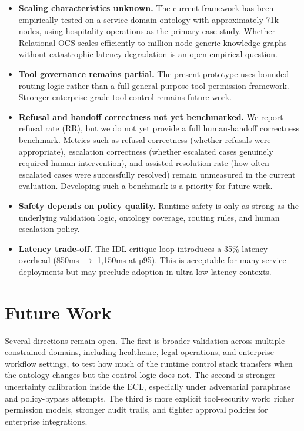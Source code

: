 \documentclass[11pt,a4paper]{article}
\begin{document}
\begin{itemize}
    \item \textbf{Scaling characteristics unknown.} The current framework has been empirically tested on a service-domain ontology with approximately 71k nodes, using hospitality operations as the primary case study. Whether Relational OCS scales efficiently to million-node generic knowledge graphs without catastrophic latency degradation is an open empirical question.
    \item \textbf{Tool governance remains partial.} The present prototype uses bounded routing logic rather than a full general-purpose tool-permission framework. Stronger enterprise-grade tool control remains future work.
    \item \textbf{Refusal and handoff correctness not yet benchmarked.} We report refusal rate ($\mathrm{RR}$), but we do not yet provide a full human-handoff correctness benchmark. Metrics such as refusal correctness (whether refusals were appropriate), escalation correctness (whether escalated cases genuinely required human intervention), and assisted resolution rate (how often escalated cases were successfully resolved) remain unmeasured in the current evaluation. Developing such a benchmark is a priority for future work.
    \item \textbf{Safety depends on policy quality.} Runtime safety is only as strong as the underlying validation logic, ontology coverage, routing rules, and human escalation policy.
    \item \textbf{Latency trade-off.} The IDL critique loop introduces a 35\% latency overhead (850ms $\rightarrow$ 1,150ms at p95). This is acceptable for many service deployments but may preclude adoption in ultra-low-latency contexts.
\end{itemize}

\section{Future Work}

Several directions remain open. The first is broader validation across multiple constrained domains, including healthcare, legal operations, and enterprise workflow settings, to test how much of the runtime control stack transfers when the ontology changes but the control logic does not. The second is stronger uncertainty calibration inside the ECL, especially under adversarial paraphrase and policy-bypass attempts. The third is more explicit tool-security work: richer permission models, stronger audit trails, and tighter approval policies for enterprise integrations.
\end{document}
